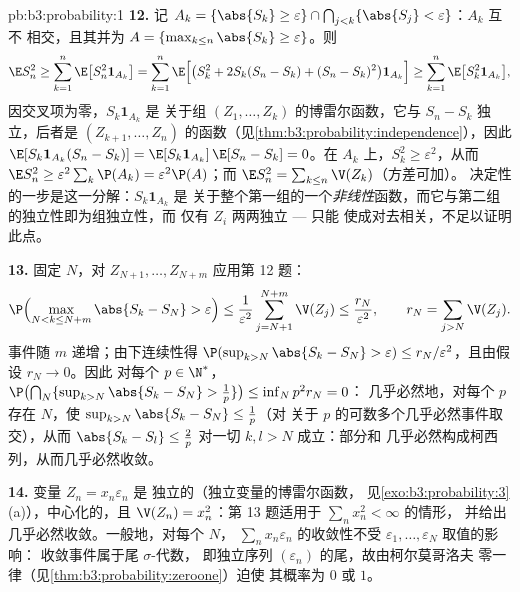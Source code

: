 \begin{solution}{pb:b3:probability:1}
\textbf{12.} 记 $A_k = \{\abs{S_k} \geq \varepsilon\} \cap
\bigcap_{j<k}\{\abs{S_j} < \varepsilon\}$：$A_k$ 互不
相交，且其并为 $A = \{\max_{k\leq n}\abs{S_k} \geq
\varepsilon\}$。则
\[
\E S_n^2 \geq \sum_{k=1}^n\E\bigl[S_n^2\mathbf 1_{A_k}\bigr]
= \sum_{k=1}^n\E\Bigl[\bigl(S_k^2 + 2S_k(S_n - S_k) + (S_n
- S_k)^2\bigr)\mathbf 1_{A_k}\Bigr]
\geq \sum_{k=1}^n\E\bigl[S_k^2\mathbf 1_{A_k}\bigr],
\]
因交叉项为零，$S_k\mathbf 1_{A_k}$ 是
关于组 $(Z_1, \dots, Z_k)$ 的博雷尔函数，它与
$S_n - S_k$ 独立，后者是 $(Z_{k+1},
\dots, Z_n)$ 的函数（见\cref{thm:b3:probability:independence}），因此
$\E[S_k\mathbf 1_{A_k}(S_n - S_k)] = \E[S_k\mathbf
1_{A_k}]\,\E[S_n - S_k] = 0$。在 $A_k$ 上，$S_k^2 \geq
\varepsilon^2$，从而 $\E S_n^2 \geq
\varepsilon^2\sum_k\P(A_k) = \varepsilon^2\P(A)$；而 $\E
S_n^2 = \sum_{k\leq n}\V(Z_k)$（方差可加）。
决定性的一步是这一分解：$S_k\mathbf 1_{A_k}$ 是
关于整个第一组的一个\emph{非线性}函数，而它与第二组
的独立性即为组独立性，而
仅有 $Z_i$ 两两独立 --- 只能
使成对去相关，不足以证明此点。

\textbf{13.} 固定 $N$，对 $Z_{N+1},
\dots, Z_{N+m}$ 应用第 12 题：
\[
\P\Bigl(\max_{N < k \leq N+m}\abs{S_k - S_N} >
\varepsilon\Bigr) \leq
\frac1{\varepsilon^2}\sum_{j=N+1}^{N+m}\V(Z_j) \leq
\frac{r_N}{\varepsilon^2},
\qquad r_N = \sum_{j>N}\V(Z_j) .
\]
事件随 $m$ 递增；由下连续性得
$\P(\sup_{k>N}\abs{S_k - S_N} > \varepsilon) \leq
r_N/\varepsilon^2$，且由假设 $r_N \to 0$。因此
对每个 $p \in \N^*$，$\P\bigl(\bigcap_N\{\sup_{k>N}
\abs{S_k - S_N} > \frac1p\}\bigr) \leq \inf_Np^2r_N = 0$：
几乎必然地，对每个 $p$ 存在 $N$，使
$\sup_{k>N}\abs{S_k - S_N} \leq \frac1p$（对
关于 $p$ 的可数多个几乎必然事件取交），从而 $\abs{S_k -
S_l} \leq \frac2p$ 对一切 $k, l > N$ 成立：部分和
几乎必然构成柯西列，从而几乎必然收敛。

\textbf{14.} 变量 $Z_n = x_n\varepsilon_n$ 是
独立的（独立变量的博雷尔函数，
见\cref{exo:b3:probability:3}(a)），中心化的，且 $\V(Z_n) =
x_n^2$：第 13 题适用于 $\sum_nx_n^2 < \infty$ 的情形，
并给出几乎必然收敛。一般地，对每个 $N$，
$\sum_nx_n\varepsilon_n$ 的收敛性不受
$\varepsilon_1, \dots, \varepsilon_N$ 取值的影响：
收敛事件属于尾 $\sigma$-代数，
即独立序列 $(\varepsilon_n)$ 的尾，故由柯尔莫哥洛夫
零一律（见\cref{thm:b3:probability:zeroone}）迫使
其概率为 $0$ 或 $1$。


\end{solution}
